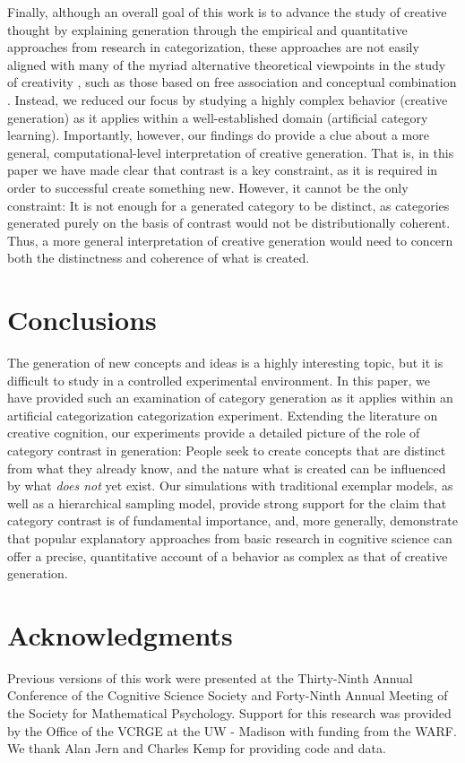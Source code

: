 \documentclass[12pt]{article}
\begin{document}
\begin{flushleft}
Finally, although an overall goal of this work is to advance the study of creative thought by explaining generation through the empirical and quantitative approaches from research in categorization, these approaches are not easily aligned with many of the myriad alternative theoretical viewpoints in the study of creativity \citep[for a review see][]{kozbelt2010theories}, such as those based on free association \citep{mednick1962associative} and conceptual combination \citep{estes2002emergence,murphy1988comprehending}. Instead, we reduced our focus by studying a highly complex behavior (creative generation) as it applies within a well-established domain (artificial category learning). Importantly, however, our findings do provide a clue about a more general, computational-level interpretation of creative generation. That is, in this paper we have made clear that contrast is a key constraint, as it is required in order to successful create something new. However, it cannot be the only constraint: It is not enough for a generated category to be distinct, as categories generated purely on the basis of contrast would not be distributionally coherent. Thus, a more general interpretation of creative generation would need to concern both the distinctness and coherence of what is created.  



\section{Conclusions}

The generation of new concepts and ideas is a highly interesting topic, but it is difficult to study in a controlled experimental environment. In this paper, we have provided such an examination of category generation as it applies within an artificial categorization categorization experiment. Extending the literature on creative cognition, our experiments provide a detailed picture of the role of category contrast in generation: People seek to create concepts that are distinct from what they already know, and the nature what is created can be influenced by what \textit{does not} yet exist. Our simulations with traditional exemplar models, as well as a hierarchical sampling model, provide strong support for the claim that category contrast is of fundamental importance, and, more generally, demonstrate that popular explanatory approaches from basic research in cognitive science can offer a precise, quantitative account of a behavior as complex as that of creative generation.


\clearpage
\section{Acknowledgments}
Previous versions of this work were presented at the Thirty-Ninth Annual Conference of the Cognitive Science Society and Forty-Ninth Annual Meeting of the Society for Mathematical Psychology. Support for this research was provided by the Office of the VCRGE at the UW - Madison with funding from the WARF. We thank Alan Jern and Charles Kemp for providing code and data.
\end{flushleft}
\end{document}
